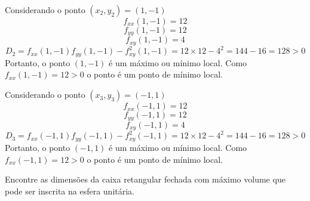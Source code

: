\documentclass[a4paper,12pt,fleqn]{article}
\begin{document}
\begin{answer}
  Considerando o ponto \((x_2, y_2) = (1, -1)\)
  \[
    f_{xx}(1, -1) = 12
  \]
  \[
    f_{yy}(1, -1) = 12
  \]
  \[
    f_{xy}(1, -1) = 4
  \]
  \[
    D_2
    = f_{xx}(1, -1)f_{yy}(1, -1) - f^2_{xy}(1, -1)
    = 12 \times 12 - 4^2
    = 144 -16
    = 128 > 0
  \]
  Portanto, o ponto $(1, -1)$ é um máximo ou mínimo local. Como \(f_{xx}(1, -1) = 12 > 0\)
  o ponto é um ponto de mínimo local.

  Considerando o ponto \((x_3, y_3) = (-1, 1)\)
  \[
    f_{xx}(-1, 1) = 12
  \]
  \[
    f_{yy}(-1, 1) = 12
  \]
  \[
    f_{xy}(-1, 1) = 4
  \]
  \[
    D_3
    = f_{xx}(-1, 1)f_{yy}(-1, 1) - f^2_{xy}(-1, 1)
    = 12 \times 12 - 4^2
    = 144 -16
    = 128 > 0
  \]
  Portanto, o ponto $(-1, 1)$ é um máximo ou mínimo local. Como \(f_{xx}(-1, 1) = 12 > 0\)
  o ponto é um ponto de mínimo local.
  \clearpage
\end{answer}

Encontre as dimensões da caixa retangular fechada com máximo volume
que pode ser inscrita na esfera unitária.
\end{document}
